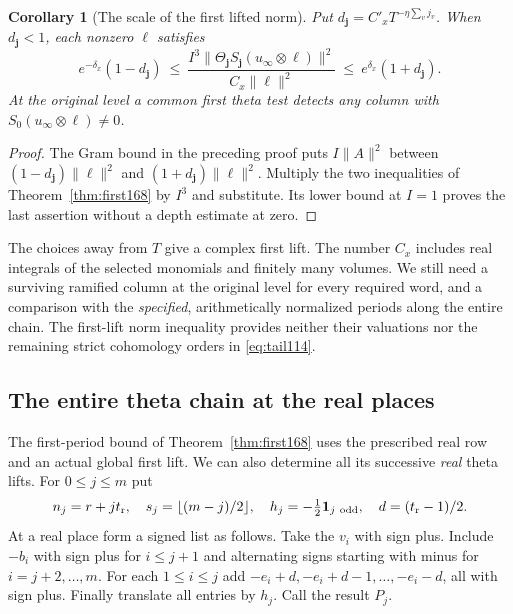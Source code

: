 \documentclass[a4paper,11pt]{article}
\newtheorem{corollary}[proposition]{Corollary}
\theoremstyle{definition}
\theoremstyle{remark}
\numberwithin{equation}{section}
\begin{document}
\begin{corollary}[The scale of the first lifted norm]
\label{cor:scale168}
Put \(d_{\boldsymbol j}=C'_xT^{-\eta\sum_v j_v}\).
When \(d_{\boldsymbol j}<1\), each nonzero \(\ell\) satisfies
\[
 e^{-\delta_x}(1-d_{\boldsymbol j})
 \ \le\ \frac{I^3\|\Theta_{\boldsymbol j}
        S_{\boldsymbol j}(u_\infty\otimes\ell)\|^2}
        {C_x\|\ell\|^2}
 \ \le\ e^{\delta_x}(1+d_{\boldsymbol j}) .
\]
At the original level a common first theta test detects any
column with \(S_0(u_\infty\otimes\ell)\ne0\).
\end{corollary}
\begin{proof}
The Gram bound in the preceding proof puts \(I\|A\|^2\)
between \((1-d_{\boldsymbol j})\|\ell\|^2\) and
\((1+d_{\boldsymbol j})\|\ell\|^2\). Multiply the two
inequalities of Theorem~\ref{thm:first168} by \(I^3\) and
substitute. Its lower bound at \(I=1\) proves the last
assertion without a depth estimate at zero.
\end{proof}

The choices away from \(T\) give a complex first lift.
The number \(C_x\) includes real integrals of the selected
monomials and finitely many volumes. We still need a surviving
ramified column at the original level for every required word,
and a comparison with the \emph{specified}, arithmetically
normalized periods along the entire chain. The first-lift norm
inequality provides neither their valuations nor the remaining
strict cohomology orders in \eqref{eq:tail114}.

\subsection{The entire theta chain at the real places}\label{nav:VIII-18}
The first-period bound of Theorem~\ref{thm:first168} uses the
prescribed real row and an actual global first lift. We can
also determine all its successive \emph{real} theta lifts.
For \(0\le j\le m\) put
\[
   n_j=r+jt_{\rm r},\quad s_j=\lfloor(m-j)/2\rfloor,\quad
   h_j=-\tfrac12\mathbf1_{j\ {\rm odd}},\quad d=(t_{\rm r}-1)/2 .
\]
At a real place form a signed list as follows. Take the
\(v_i\) with sign plus. Include \(-b_i\) with sign plus for
\(i\le j+1\) and alternating signs starting with minus for
\(i=j+2,\ldots,m\). For each \(1\le i\le j\) add
\(-e_i+d,-e_i+d-1,\ldots,-e_i-d\), all with sign plus.
Finally translate all entries by \(h_j\). Call the result \(P_j\).
\end{document}
